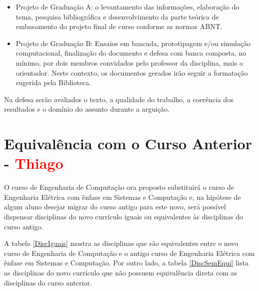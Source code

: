 \begin{itemize}
\item Projeto de Graduação A: o levantamento das informações, elaboração do tema, pesquisa bibliográfica e desenvolvimento da parte teórica de embasamento do projeto final de curso conforme as normas ABNT.
\item Projeto de Graduação B: Ensaios em bancada, prototipagem e/ou simulação computacional, finalização do documento e defesa com banca composta, no mínimo, por dois membros convidados pelo professor da disciplina, mais o orientador.
Neste contexto, os documentos gerados irão seguir a formatação sugerida pela Biblioteca.
\end{itemize}

Na defesa serão avaliados o texto, a qualidade do trabalho, a coerência dos resultados e o domínio do assunto durante a arguição.

\section{Equivalência com o Curso Anterior - \textcolor{red}{Thiago}}

O curso de Engenharia de Computação ora proposto substituirá o curso de Engenharia Elétrica com ênfase em Sistemas e Computação e, na hipótese de algum aluno desejar migrar do curso antigo para este novo, será possível dispensar disciplinas do novo currículo iguais ou equivalentes às disciplinas do curso antigo.

A tabela \ref{DiscIguais} mostra as disciplinas que são equivalentes entre o novo curso de Engenharia de Computação e o antigo curso de Engenharia Elétrica com ênfase em Sistemas e Computação. Por outro lado, a tabela \ref{DiscSemEqui} lista as disciplinas do novo currículo que não possuem equivalência direta com as disciplinas do curso anterior.

